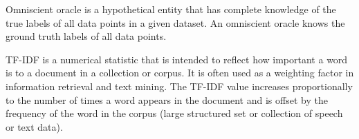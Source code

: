\begin{defn}
\label{def:omniscient_oracles}
Omniscient oracle is a hypothetical entity that has complete knowledge of the true labels of all data points in a given dataset. An omniscient oracle knows the ground truth labels of all data points.
\end{defn}

\begin{defn}[TF-IDF]
\label{def:tf_idf}
TF-IDF is a numerical statistic that is intended to reflect how important a word is to a document in a collection or corpus. It is often used as a weighting factor in information retrieval and text mining. The TF-IDF value increases proportionally to the number of times a word appears in the document and is offset by the frequency of the word in the corpus (large structured set or collection of speech or text data).
\end{defn}